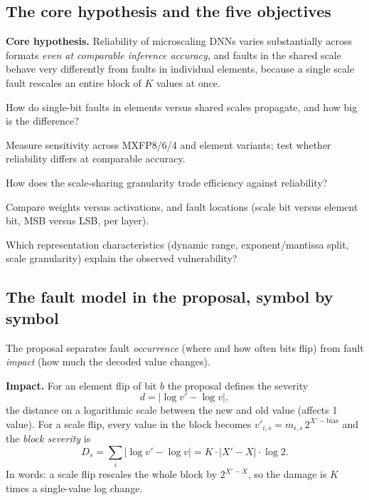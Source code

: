 \subsection{The core hypothesis and the five objectives}
\begin{keyidea}
\textbf{Core hypothesis.} Reliability of microscaling DNNs varies substantially across formats \emph{even at comparable inference accuracy}, and faults in the shared scale behave very differently from faults in individual elements, because a single scale fault rescales an entire block of $K$ values at once.
\end{keyidea}
\begin{description}[leftmargin=1.2cm,style=nextline]
\item[O1 Fault propagation] How do single-bit faults in elements versus shared scales propagate, and how big is the difference?
\item[O2 Format sensitivity] Measure sensitivity across MXFP8/6/4 and element variants; test whether reliability differs at comparable accuracy.
\item[O3 Block-size effect] How does the scale-sharing granularity trade efficiency against reliability?
\item[O4 Tensor and location] Compare weights versus activations, and fault locations (scale bit versus element bit, MSB versus LSB, per layer).
\item[O5 Vulnerability drivers] Which representation characteristics (dynamic range, exponent/mantissa split, scale granularity) explain the observed vulnerability?
\end{description}

\subsection{The fault model in the proposal, symbol by symbol}
The proposal separates fault \emph{occurrence} (where and how often bits flip) from fault \emph{impact} (how much the decoded value changes).

\textbf{Impact.} For an element flip of bit $b$ the proposal defines the severity
\[
d=\bigl|\log v'-\log v\bigr|,
\]
the distance on a logarithmic scale between the new and old value (affects 1 value). For a scale flip, every value in the block becomes $v'_{i,s}=m_{i,s}\,2^{X'-\mathrm{bias}}$ and the \emph{block severity} is
\[
D_s=\sum_i\bigl|\log v'-\log v\bigr|=K\cdot|X'-X|\cdot\log2 .
\]
In words: a scale flip rescales the whole block by $2^{X'-X}$, so the damage is $K$ times a single-value log change.

